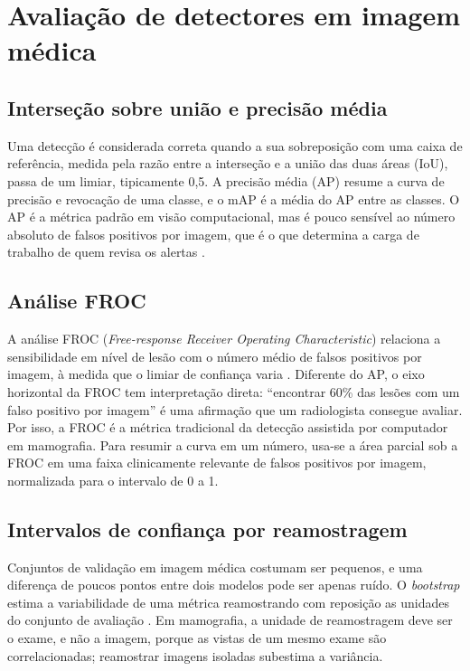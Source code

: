\section{Avaliação de detectores em imagem médica}

\subsection{Interseção sobre união e precisão média}

Uma detecção é considerada correta quando a sua sobreposição com uma caixa de referência, medida pela razão entre a interseção e a união das duas áreas (IoU), passa de um limiar, tipicamente 0,5. A precisão média (AP) resume a curva de precisão e revocação de uma classe, e o mAP é a média do AP entre as classes. O AP é a métrica padrão em visão computacional, mas é pouco sensível ao número absoluto de falsos positivos por imagem, que é o que determina a carga de trabalho de quem revisa os alertas \cite{maierhein2024metrics}.

\subsection{Análise FROC}

A análise FROC (\textit{Free-response Receiver Operating Characteristic}) relaciona a sensibilidade em nível de lesão com o número médio de falsos positivos por imagem, à medida que o limiar de confiança varia \cite{bunch1978froc}. Diferente do AP, o eixo horizontal da FROC tem interpretação direta: ``encontrar 60\% das lesões com um falso positivo por imagem'' é uma afirmação que um radiologista consegue avaliar. Por isso, a FROC é a métrica tradicional da detecção assistida por computador em mamografia. Para resumir a curva em um número, usa-se a área parcial sob a FROC em uma faixa clinicamente relevante de falsos positivos por imagem, normalizada para o intervalo de 0 a 1.

\subsection{Intervalos de confiança por reamostragem}

Conjuntos de validação em imagem médica costumam ser pequenos, e uma diferença de poucos pontos entre dois modelos pode ser apenas ruído. O \textit{bootstrap} estima a variabilidade de uma métrica reamostrando com reposição as unidades do conjunto de avaliação \cite{efron1993bootstrap}. Em mamografia, a unidade de reamostragem deve ser o exame, e não a imagem, porque as vistas de um mesmo exame são correlacionadas; reamostrar imagens isoladas subestima a variância.

